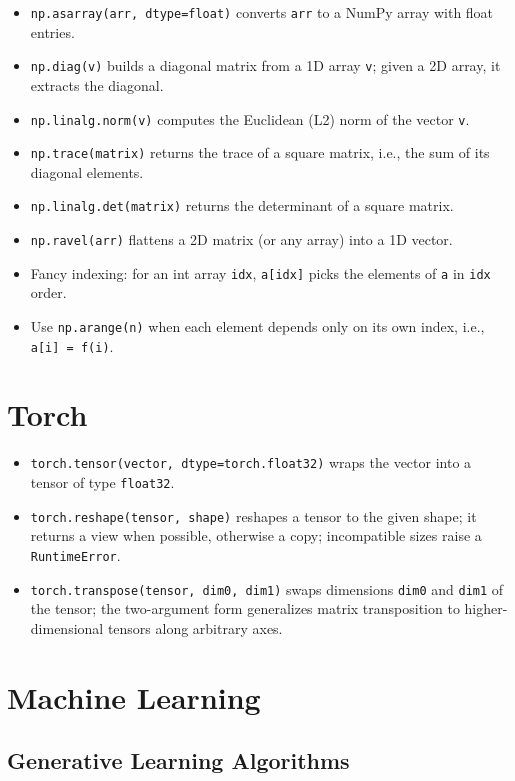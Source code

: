 \documentclass{article}
\begin{document}
\begin{itemize}
    \item \texttt{np.asarray(arr, dtype=float)} converts \texttt{arr} to a NumPy array with float entries.
    \item \texttt{np.diag(v)} builds a diagonal matrix from a 1D array \texttt{v}; given a 2D array, it extracts the diagonal.
    \item \texttt{np.linalg.norm(v)} computes the Euclidean (L2) norm of the vector \texttt{v}.
    \item \texttt{np.trace(matrix)} returns the trace of a square matrix, i.e., the sum of its diagonal elements.
    \item \texttt{np.linalg.det(matrix)} returns the determinant of a square matrix.
    \item \texttt{np.ravel(arr)} flattens a 2D matrix (or any array) into a 1D vector.
    \item Fancy indexing: for an int array \texttt{idx}, \texttt{a[idx]} picks the elements of \texttt{a} in \texttt{idx} order.
    \item Use \texttt{np.arange(n)} when each element depends only on its own index, i.e., \texttt{a[i] = f(i)}.
\end{itemize}

\section{Torch}
\label{sec:torch}
\begin{itemize}
    \item \texttt{torch.tensor(vector, dtype=torch.float32)} wraps the vector into a tensor of type \texttt{float32}.
    \item \texttt{torch.reshape(tensor, shape)} reshapes a tensor to the given shape; it returns a view when possible, otherwise a copy; incompatible sizes raise a \texttt{RuntimeError}.
    \item \texttt{torch.transpose(tensor, dim0, dim1)} swaps dimensions \texttt{dim0} and \texttt{dim1} of the tensor; the two-argument form generalizes matrix transposition to higher-dimensional tensors along arbitrary axes.
\end{itemize}

\section{Machine Learning}
\label{sec:ml}

\subsection{Generative Learning Algorithms}
\label{subsec:ml:gla}
\end{document}
